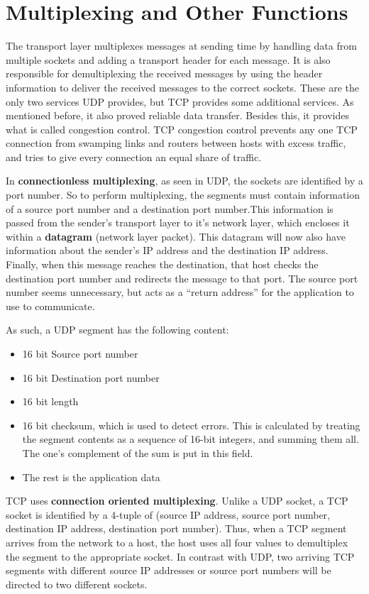 \documentclass[12pt,letterpaper]{book}
\theoremstyle{definition}
\begin{document}
\section{Multiplexing and Other Functions}

The transport layer multiplexes messages at sending time by handling data from multiple sockets and adding a transport header for each message. It is also responsible for demultiplexing the received messages by using the header information to deliver the received messages to the correct sockets. These are the only two services UDP provides, but TCP provides some additional services. As mentioned before, it also proved reliable data transfer. Besides this, it provides what is called congestion control. TCP congestion control prevents any one TCP connection from swamping links and routers between hosts with excess traffic, and tries to give every connection an equal share of traffic.

In \textbf{connectionless multiplexing}, as seen in UDP, the sockets are identified by a port number. So to perform multiplexing, the segments must contain information of a source port number and a destination port number.This information is passed from the sender's transport layer to it's network layer, which encloses it within a \textbf{datagram}  (network layer packet). This datagram will now also have information about the sender's IP address and the destination IP address. Finally, when this message reaches the destination, that host checks the destination port number and redirects the message to that port. The source port number seems unnecessary, but acts as a ``return address'' for the application to use to communicate.

As such, a UDP segment has the following content:

\begin{itemize}
  \item 16 bit Source port number
  \item 16 bit Destination port number
  \item 16 bit length
  \item 16 bit checksum, which is used to detect errors. This is calculated by treating the segment contents as a sequence of 16-bit integers, and summing them all. The one's complement of the sum is put in this field.
  \item The rest is the application data
\end{itemize}

TCP uses \textbf{connection oriented multiplexing}. Unlike a UDP socket, a TCP socket is identified by a 4-tuple of (source IP address, source port number, destination IP address, destination port number). Thus, when a TCP segment arrives from the network to a host, the host uses all four values to demultiplex the segment to the appropriate socket. In contrast with UDP, two arriving TCP segments with different source IP addresses or source port numbers will be directed to two different sockets.
\end{document}

